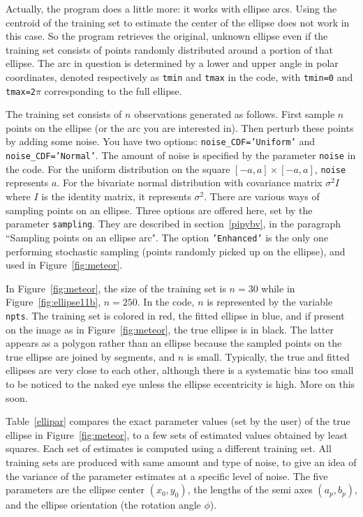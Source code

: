 \documentclass[oneside,10pt]{book}
\begin{document}
Actually, the program does a little more: it works with ellipse arcs. Using the centroid of the training set to estimate the center of the ellipse does not work in this case. So the program retrieves the original, unknown ellipse even if the training set consists of points randomly distributed around a portion of that ellipse. The arc in question is determined by a lower and upper angle in polar coordinates,
 denoted respectively as \texttt{tmin} and \texttt{tmax} in the code, with \texttt{tmin=0} and \texttt{tmax=2$\pi$} corresponding to the full ellipse.  

The training set consists of $n$ observations generated as follows. 
First sample $n$ points on the ellipse (or the arc you are interested in). Then perturb these points by adding some noise. You have two options:
 \texttt{noise\_CDF='Uniform'} and \texttt{noise\_CDF='Normal'}. The amount of noise is specified by the parameter 
 \texttt{noise} in the code. For the uniform distribution on the square $[-a,a] \times [-a,a ]$, \texttt{noise} represents $a$. For the bivariate normal distribution with covariance matrix $\sigma^2 I$ where $I$ is the identity matrix, it represents $\sigma^2$. There are various ways of sampling points on an ellipse. Three options are offered here, set by the parameter \texttt{sampling}. 
They are described in section~\ref{pipybv}, in the paragraph ``Sampling points on an ellipse arc". The option \texttt{'Enhanced'} is the only one performing  stochastic sampling (points randomly picked up on the ellipse), and used in Figure~\ref{fig:meteor}. 


In Figure~\ref{fig:meteor}, the size of the training set is $n=30$ while in Figure~\ref{fig:ellipse11b}, $n=250$. In the code, $n$ is represented by the variable \texttt{npts}. The training set is colored in red, the fitted ellipse in blue, and if present on the image as in Figure~\ref{fig:meteor}, the
 true ellipse is in black. The latter appears as a polygon rather than an ellipse because the sampled points on the true ellipse are joined by segments, 
 and $n$ is small. Typically, the true and fitted ellipses are very close to each other, although there is a systematic bias too small to be noticed to the naked eye unless the ellipse eccentricity is high. More on this soon.

Table~\ref{ellipar} compares the exact parameter values (set by the user) of the true ellipse in
 Figure~\ref{fig:meteor},  to a few sets of estimated values obtained by least squares. Each set of estimates is computed using
 a different training set. All training sets are produced with same amount and type of noise, to give an idea of the variance of the parameter estimates  
 at a specific level of noise.  The five parameters are the ellipse center $(x_0,y_0)$, the lengths of the semi axes $(a_p, b_p)$, and the ellipse orientation
 (the rotation angle $\phi$). 
\end{document}
